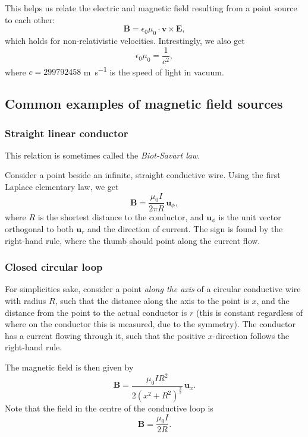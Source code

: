 \documentclass[a4paper, 12pt]{article}
\renewcommand{\vec}[1]{\mathbf{#1}}
\newcommand{\E}{\ensuremath{\vec{E}}}
\newcommand{\e}{\ensuremath{\epsilon_0}}
\newcommand{\B}{\ensuremath{\vec{B}}}
\begin{document}
        This helps us relate the electric and magnetic field resulting from a point source to each other:
        \begin{equation}
            \B = \e \mu_0 \cdot\vec{v}\times\E,
        \end{equation}
        which holds for non-relativistic velocities. Intrestingly, we also get 
        \begin{equation}
            \e\mu_0 = \frac{1}{c^2},
        \end{equation}
        where $c = 299792458$ \si{\metre\per\second} is the speed of light in vacuum.

    \subsection{Common examples of magnetic field sources}
        \subsubsection{Straight linear conductor}
            This relation is sometimes called the \textit{Biot-Savart law}.

            Consider a point beside an infinite, straight conductive wire. Using the first Laplace elementary law, we get 
            \begin{equation}
                \B = \frac{\mu_0 I}{2\pi R}\,\vec{u}_\phi,
            \end{equation}
            where $R$ is the shortest distance to the conductor, and $\vec{u}_\phi$ is the  unit vector orthogonal to both $\vec{u}_r$ and the direction of current.
            The sign is found by the right-hand rule, where the thumb should point along the current flow.
            
        \subsubsection{Closed circular loop}
            For simplicities sake, consider a point \textit{along the axis} of a circular conductive wire with radius $R$, 
            such that the distance along the axis to the point is $x$, and the distance from the point to the actual conductor is $r$ 
            (this is constant regardless of where on the conductor this is measured, due to the symmetry).
            The conductor has a current flowing through it, such that the positive $x$-direction follows the right-hand rule. 

            The magnetic field is then given by
            \begin{equation}
                \B = \frac{\mu_0 I R^2}{2 \left(x^2 + R^2\right)^\frac{3}{2}}\,\vec{u}_x.
            \end{equation}
            Note that the field in the centre of the conductive loop is
            \begin{equation}
                \B = \frac{\mu_0 I}{2R}.
            \end{equation}
        
\end{document}
